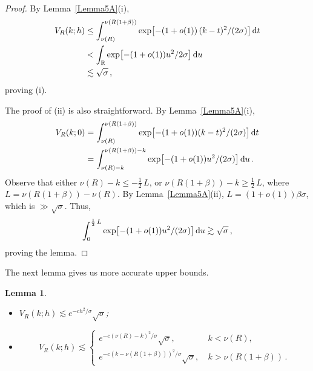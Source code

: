 \documentclass[10pt,a4paper]{amsart}
\newtheorem{lemma}{Lemma}
\newcommand{\bR}{\mathbb R}
\begin{document}
\begin{proof}
By Lemma~\ref{Lemma5A}(i),
\begin{align*}
V_R(k; h) &\le \int_{\nu(R)}^{\nu(R(1+\beta))}
\exp\bigl[ - (1+o(1))\,(k-t)^2/(2\sigma)\bigr]\, {\rm d}t \\
&<\int_\bR \exp\bigl[ -(1+o(1))u^2/{2\sigma} \bigr]\, {\rm d}u \\
&\lesssim\sqrt{\sigma}\,,
\end{align*}
proving (i).

The proof of (ii) is also straightforward. By Lemma~\ref{Lemma5A}(i),
\begin{align*}
V_R(k; 0) &=
\int_{\nu(R)}^{\nu(R(1+\beta))} \exp\bigl[ - (1+o(1))(k-t)^2/(2\sigma) \bigr]\, {\rm d}t \\
&=
\int_{\nu(R)-k}^{\nu(R(1+\beta))-k} \exp\bigl[ - (1+o(1))u^2/(2\sigma) \bigr]\, {\rm d}u\,.
\end{align*}
Observe that either $\nu (R) - k \le -\tfrac12\,L$, or $\nu (R(1+\beta))-k \ge \tfrac12\, L$,
where $L=\nu (R(1+\beta))-\nu (R)$. By Lemma~\ref{Lemma5A}(ii), $L=(1+o(1))\beta\sigma$, which is
$\gg \sqrt{\sigma}$. Thus,
\[
\int_0^{\frac12\, L} \exp\bigl[ - (1+o(1))u^2/(2\sigma) \bigr]\, {\rm d}u \gtrsim \sqrt{\sigma}\,,
\]
proving the lemma.
\end{proof}

The next lemma gives us more accurate upper bounds.

\begin{lemma}\label{Lemma5B}\mbox{}
\begin{itemize}
\item[{\rm (i)}] $V_R(k; h) \lesssim e^{-ch^2/\sigma}\sqrt{\sigma}$;
\item[{\rm (ii)}]
\[
V_R(k; h) \lesssim
\begin{cases}
e^{-c(\nu(R)-k)^2/\sigma}\sqrt{\sigma}, \ &k<\nu(R), \\
e^{-c(k-\nu(R(1+\beta)))^2/\sigma}\sqrt{\sigma}, \ &k>\nu(R(1+\beta))\,.
\end{cases}
\]
\end{itemize}
\end{lemma}
\end{document}
